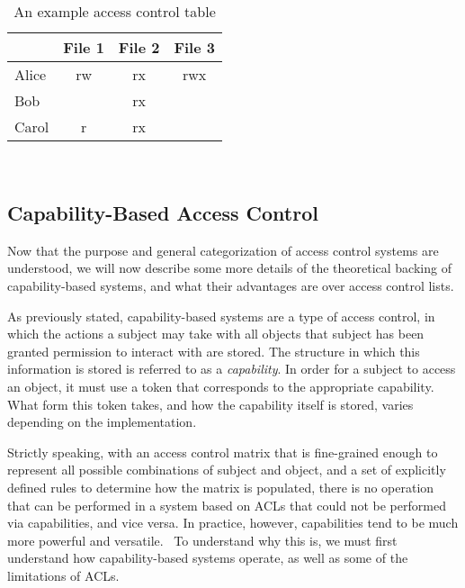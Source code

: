 \begin{table}[t]
 \centering
 
  \begin{tabular}{|l||c|c|c|}
    \hline
    &File 1&File 2&File 3\\
    \hline
    \hline
    Alice&rw&rx&rwx\\
    \hline
    Bob&&rx&\\
    \hline
    Carol&r&rx&\\
    \hline
  \end{tabular}\\
  \bigskip
  \caption{An example access control table}
  \label{acmatrix}
  
\end{table}

\subsection{Capability-Based Access Control}

Now that the purpose and general categorization of access control systems are understood, we will now describe some more details of the theoretical backing of capability-based systems, and what their advantages are over access control lists.

As previously stated, capability-based systems are a type of access control, in which the actions a subject may take with all objects that subject has been granted permission to interact with are stored. The structure in which this information is stored is referred to as a {\em capability}. In order for a subject to access an object, it must use a token that corresponds to the appropriate capability. What form this token takes, and how the capability itself is stored, varies depending on the implementation.

Strictly speaking, with an access control matrix that is fine-grained enough to represent all possible combinations of subject and object, and a set of explicitly defined rules to determine how the matrix is populated, there is no operation that can be performed in a system based on ACLs that could not be performed via capabilities, and vice versa. In practice, however, capabilities tend to be much more powerful and versatile.~\cite{miller2003} To understand why this is, we must first understand how capability-based systems operate, as well as some of the limitations of ACLs.

